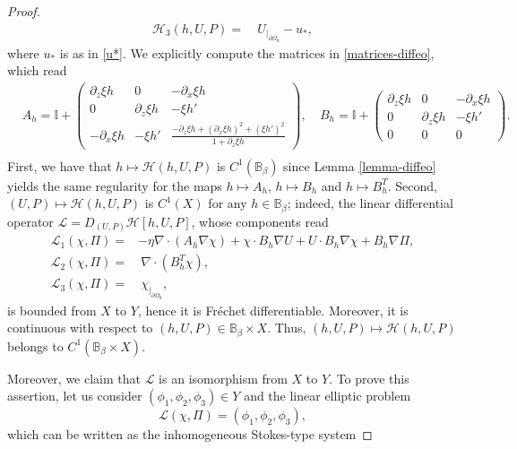 \documentclass[10pt,a4paper]{amsart}
\begin{document}
\begin{proof}
\begin{equation}
\begin{aligned}
    \mathcal{H}_3(h, U, P)= & \ U_{|_{\partial \Omega_0}} - u_*,
	\end{aligned}
\end{equation}where $u_*$ is as in \eqref{u*}. We explicitly compute the matrices in \eqref{matrices-diffeo}, which read
\begin{equation}\label{exp-matrices}\begin{aligned}
 &A_h= \mathbb{I}  +\left(\begin{matrix}
\partial_z \xi h
  & 0 & -\partial_x \xi h \\[5pt]0&\partial_z \xi h & - \xi h'\\[5pt]
-\partial_x \xi h& - \xi h'&\frac{-\partial_z\xi h + (\partial_x \xi h)^2 + (\xi h')^2}{1+ \partial_z \xi h}
\end{matrix}\right), \
 &B_h= \mathbb{I} +\left(\begin{matrix}
\partial_z \xi h  & 0&-\partial_x \xi h \\[5pt]0 & \partial_z \xi h&  - \xi h'\\[5pt]
0 & 0& 0
\end{matrix}\right).\\[5pt]
\end{aligned}
\end{equation}
First, we have that $h\mapsto\mathcal{H}(h, U, P)$ is $C^1(\mathbb{B}_{\beta})$ since Lemma \ref{lemma-diffeo} yields the same regularity for the maps $h\mapsto A_h$, $h\mapsto B_h$ and $h\mapsto B_h^T$. Second, $(U,P)\mapsto \mathcal{H}(h, U,P)$ is $C^1(X)$ for any $h\in \mathbb{B}_{\beta}$; indeed, the linear differential operator $\mathcal{L}=D_{(U, P)}\mathcal{H}[h,U,P]$, whose components read
\begin{equation*}\begin{aligned}
\mathcal{L}_1( \chi, \Pi)= &-\eta\nabla \cdot (A_h\nabla \chi) + \chi \cdot B_h\nabla U + U \cdot B_h\nabla \chi+ B_h\nabla \Pi,\\[5pt]
\mathcal{L}_2( \chi, \Pi)= & \ \nabla \cdot (B_h^T\chi),\\[5pt]
\mathcal{L}_3( \chi, \Pi)  = &  \ \chi_{|_{\partial \Omega_0}},
\end{aligned}
\end{equation*} is bounded from  $X$ to $Y$, hence it is Fréchet differentiable. Moreover, it is continuous with respect to $(h,U,P)\in \mathbb{B}_\beta\times X$.
Thus, $(h, U, P) \mapsto\mathcal{H}(h, U, P)$ belongs to $C^1(  \mathbb{B}_\beta\times X)$. \par Moreover, we claim that $\mathcal{L}$ is an isomorphism from $X$ to $Y$. To prove this assertion, let us consider $(\phi_1, \phi_2, \phi_3 )\in Y$ and the linear elliptic problem \begin{equation}\label{iso-eq}\mathcal{L}(\chi, \Pi)= (\phi_1, \phi_2, \phi_3), \end{equation} which can be written as the inhomogeneous Stokes-type system

\end{proof}
\end{document}
